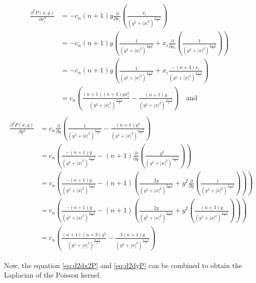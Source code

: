 \begin{align}\label{eq:d2dx2P}
\begin{split}
    \frac{\partial^2 P(x,y)}{\partial x_i^2}&=-c_n(n+1)y\frac{\partial}{\partial x_i}\left(\frac{x_i}{(y^2+|x|^2)^{\frac{n+3}{2}}}\right) \\
    &=-c_n(n+1)y\left(\frac{1}{(y^2+|x|^2)^{\frac{n+3}{2}}}+x_i\frac{\partial}{\partial x_i}\left(\frac{1}{(y^2+|x|^2)^{\frac{n+3}{2}}}\right) \right) \\
    &=-c_n(n+1)y\left(\frac{1}{(y^2+|x|^2)^{\frac{n+3}{2}}}+x_i\frac{-(n+3)x_i}{(y^2+|x|^2)^{\frac{n+5}{2}}}\right)\\
    &=c_n\left(\frac{(n+1)(n+3)yx_i^2}{(y^2+|x|^2)^{\frac{n+5}{2}}}-\frac{(n+1)y}{(y^2+|x|^2)^{\frac{n+3}{2}}} \right) \quad \text{and}
\end{split}
\end{align}
\begin{align}\label{eq:d2dyP}
\begin{split}
    \frac{\partial^2 P(x,y)}{\partial y^2}&=c_n\frac{\partial}{\partial y}\left(\frac{1}{(y^2+|x|^2)^{\frac{n+1}{2}}}-\frac{(n+1)y^2}{(y^2+|x|^2)^{\frac{n+3}{2}}}\right) \\
    &=c_n\left(\frac{-(n+1)y}{(y^2+|x|^2)^{\frac{n+3}{2}}}-(n+1)\frac{\partial}{\partial y}\left(\frac{y^2}{(y^2+|x|^2)^{\frac{n+3}{2}}} \right) \right) \\
    &=c_n\left(\frac{-(n+1)y}{(y^2+|x|^2)^{\frac{n+3}{2}}}-(n+1)\left(\frac{2y}{(y^2+|x|^2)^{\frac{n+3}{2}}}+y^2\frac{\partial}{\partial y}\left(\frac{1}{(y^2+|x|^2)^{\frac{n+3}{2}}}\right)\right)\right) \\
    &=c_n\left(\frac{-(n+1)y}{(y^2+|x|^2)^{\frac{n+3}{2}}}-(n+1)\left(\frac{2y}{(y^2+|x|^2)^{\frac{n+3}{2}}}+y^2\left(\frac{(n+3)y}{(y^2+|x|^2)^{\frac{n+5}{2}}}\right)\right)\right)  \\
    &=c_n\left(\frac{(n+1)(n+3)y^3}{(y^2+|x|^2)^{\frac{n+5}{2}}}-\frac{3(n+1)y}{(y^2+|x|^2)^{\frac{n+3}{2}}} \right)
\end{split}
\end{align}

\noindent Now, the equation \ref{eq:d2dx2P} and \ref{eq:d2dyP} can be combined to obtain the Laplacian of the Poisson kernel.

